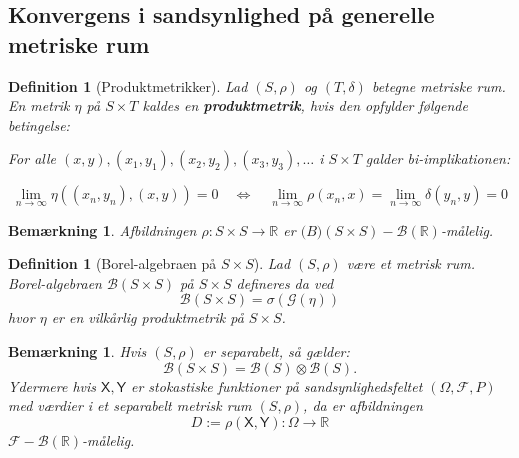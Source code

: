 \documentclass{article}
\newcommand{\R}{\mathbb{R}}
\newcommand{\1}{\mathbbm{1}}
\newcommand{\X}{\mathsf{X}}
\newcommand{\Y}{\mathsf{Y}}
\newcommand{\pfield}{(\Omega, \mathcal{F}, P)}
\theoremstyle{boxed}
\newtheorem{definition}[theorem]{Definition}
\newtheorem{remark}[theorem]{Bemærkning}
\begin{document}
\subsection{Konvergens i sandsynlighed på generelle metriske rum}
\begin{theorem-box}
    \begin{definition}[Produktmetrikker]
        Lad $(S, \rho)$ og $(T, \delta)$ betegne metriske rum.
En metrik $\eta$ på $S \times T$ kaldes en \textbf{produktmetrik}, hvis den opfylder følgende betingelse:

For alle $(x, y),\left(x_1, y_1\right),\left(x_2, y_2\right),\left(x_3, y_3\right), \ldots$ i $S \times T$ galder bi-implikationen:

$$
\lim _{n \rightarrow \infty} \eta\left(\left(x_n, y_n\right),(x, y)\right)=0 \quad\Longleftrightarrow \quad\lim _{n \rightarrow \infty} \rho\left(x_n, x\right)=\lim _{n \rightarrow \infty} \delta\left(y_n, y\right)=0
$$

    \end{definition}
\end{theorem-box}
\begin{remark}
    Afbildningen $\rho:S\times S\rightarrow\R$ er $\mathcal(B)(S\times S)-\mathcal{B}(\R)$-målelig.
\end{remark}
\begin{theorem-box}
    \begin{definition}[Borel-algebraen på $S\times S$]
        Lad $(S, \rho)$ være et metrisk rum.
Borel-algebraen $\mathcal{B}(S \times S)$ på $S \times S$ defineres da ved
$$
\mathcal{B}(S \times S)=\sigma(\mathcal{G}(\eta))
$$
hvor $\eta$ er en vilkårlig produktmetrik på $S \times S$.
    \end{definition}
\end{theorem-box}
\begin{remark}
    Hvis $(S,\rho)$ er separabelt, så gælder: $$\mathcal{B}(S\times S)=\mathcal{B}(S)\otimes\mathcal{B}(S).$$ Ydermere hvis $\X,\Y$ er stokastiske funktioner på sandsynlighedsfeltet $\pfield$ med værdier i et separabelt metrisk rum $(S,\rho)$, da er afbildningen $$D:=\rho(\X,\Y):\Omega\rightarrow \R$$ $\mathcal{F}-\mathcal{B}(\R)$-målelig.
\end{remark}
\end{document}
